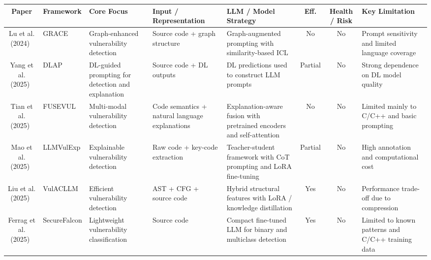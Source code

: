 \documentclass[conference]{IEEEtran}
\begin{document}
\begin{table}[!t]
\centering
\scriptsize
\setlength{\tabcolsep}{2.5pt}
\renewcommand{\arraystretch}{1.12}

\begin{tabular}{@{}c
>{\RaggedRight\arraybackslash}p{1.55cm}
>{\RaggedRight\arraybackslash}p{2.00cm}
>{\RaggedRight\arraybackslash}p{2.15cm}
>{\RaggedRight\arraybackslash}p{2.45cm}
c
c
>{\RaggedRight\arraybackslash}p{2.55cm}@{}}
\toprule
\textbf{Paper} &
\textbf{Framework} &
\textbf{Core Focus} &
\textbf{Input / Representation} &
\textbf{LLM / Model Strategy} &
\textbf{Eff.} &
\textbf{Health / Risk} &
\textbf{Key Limitation} \\
\midrule

Lu et al. (2024)~\cite{lu2024} &
GRACE &
Graph-enhanced vulnerability detection &
Source code + graph structure &
Graph-augmented prompting with similarity-based ICL &
No &
No &
Prompt sensitivity and limited language coverage \\

Yang et al. (2025)~\cite{yang2025} &
DLAP &
DL-guided prompting for detection and explanation &
Source code + DL outputs &
DL predictions used to construct LLM prompts &
Partial &
No &
Strong dependence on DL model quality \\

Tian et al. (2025)~\cite{tian2025} &
FUSEVUL &
Multi-modal vulnerability detection &
Code semantics + natural language explanations &
Explanation-aware fusion with pretrained encoders and self-attention &
No &
No &
Limited mainly to C/C++ and basic prompting \\

Mao et al. (2025)~\cite{mao2025} &
LLMVulExp &
Explainable vulnerability detection &
Raw code + key-code extraction &
Teacher-student framework with CoT prompting and LoRA fine-tuning &
Partial &
No &
High annotation and computational cost \\

Liu et al. (2025)~\cite{liu2025} &
VulACLLM &
Efficient vulnerability detection &
AST + CFG + source code &
Hybrid structural features with LoRA / knowledge distillation &
Yes &
No &
Performance trade-off due to compression \\

Ferrag et al. (2025)~\cite{ferrag2025} &
SecureFalcon &
Lightweight vulnerability classification &
Source code &
Compact fine-tuned LLM for binary and multiclass detection &
Yes &
No &
Limited to known patterns and C/C++ training data \\


\end{tabular}
\end{table}
\end{document}
